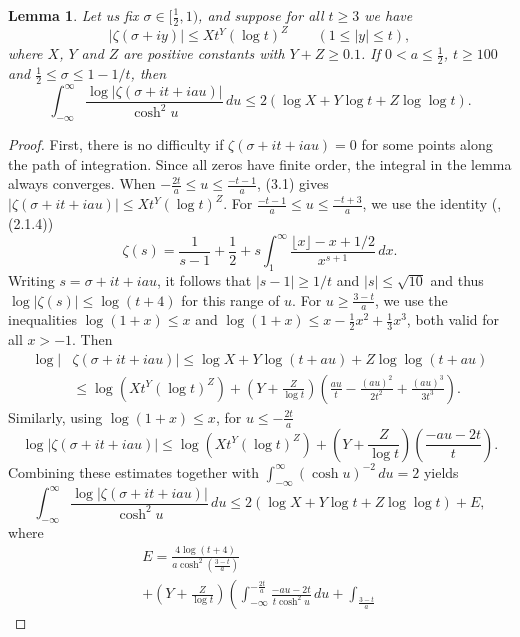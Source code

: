 \documentclass[10pt]{amsart}
\theoremstyle{remark}
\theoremstyle{plain}
\newtheorem{lemma}{Lemma}[section]
\numberwithin{equation}{section}
\theoremstyle{definition}
\def\({\left(}
\def\){\right)}
\def\pfrac#1#2{\left(\frac{#1}{#2}\right)}
\def\sg{\sigma}
\def\sit{\sigma + it}
\begin{document}
%
%

\begin{lemma}\label{lem:integral}
Let us fix $\sigma \in [ \tfrac12, 1)$, and suppose
for all $t\ge 3$ we have
\begin{equation}
|\zeta(\sg+iy)| \le X t^Y (\log t)^Z \qquad (1 \le |y| \le t),
\label{eq:zeta upper gen}
\end{equation}
where $X$, $Y$ and $Z$ are positive constants with $Y+Z \ge 0.1$.
If $0<a\le \frac12$,
$t\ge 100$ and $\frac12 \le \sg \le 1-1/t$, then
$$
\int_{-\infty}^\infty \frac{\log |\zeta(\sit+iau)|}{\cosh^2 u}\, du \le
2(\log X + Y\log t + Z \log\log t).
$$
\end{lemma}

\begin{proof}  First, there is no difficulty if $\zeta(\sigma+it+iau)=0$
for some points along the path of integration.  Since all zeros have 
finite order, the integral in the lemma always converges.
 When $-\frac{2t}{a} \le u\le  \frac{-t-1}{a}$,
(3.1) gives $|\zeta(\sit+iau)| \le  X t^Y (\log t)^Z$.
For $\frac{-t-1}{a} \le u \le \frac{-t+3}{a}$, we use the
identity (\cite{T}, (2.1.4))
$$
\zeta(s)=\frac{1}{s-1}+\frac12 + s \int_1^\infty \frac{\lfloor x \rfloor-x
+1/2}{x^{s+1}}\, dx.
$$
Writing $s=\sigma+it+iau$, it follows that $|s-1| \ge 1/t$ and
$|s| \le \sqrt{10}$ and thus $\log|\zeta(s)| \le \log(t+4)$ for this
range of $u$.
For $u\ge \frac{3-t}{a}$, we use the inequalities
$\log(1+x) \le x$ and $\log(1+x)\le x-\frac12 x^2 + \frac13
x^3$, both valid for all $x>-1$.  Then
\begin{align*}
\log |&\zeta(\sit+iau)| \le \log X + Y\log(t+au)+Z\log\log(t+au)\\
 &\le \log(Xt^Y(\log t)^Z)
+\(Y+\frac{Z}{\log t}\) \(\frac{au}{t}-\frac{(au)^2}{2t^2}+\frac{(au)^3}
{3t^3} \).
\end{align*}
Similarly, using $\log(1+x)\le x$, for $u\le - \frac{2t}{a}$
$$
\log |\zeta(\sit+iau)| \le \log(Xt^Y(\log t)^Z)
+\(Y+\frac{Z}{\log t}\) \pfrac{-au-2t}{t}.
$$
Combining these estimates together with
$\int_{-\infty}^\infty (\cosh u)^{-2}\, du = 2$ yields
$$
\int_{-\infty}^\infty \frac{\log |\zeta(\sit+iau)|}{\cosh^2 u}\, du \le
2(\log X + Y\log t + Z \log\log t)  + E,
$$
where
\begin{multline*}
E = \frac{4\log(t+4)}{a\cosh^2 \pfrac{3-t}{a}} \\
+ \(Y+\frac{Z}{\log t}\) \(  \int_{-\infty}^{-\frac{2t}{a}}
  \frac{-au-2t}{t \cosh^2 u}\, du + \int_{\frac{3-t}{a}}

\end{multline*}
\end{proof}
\end{document}

